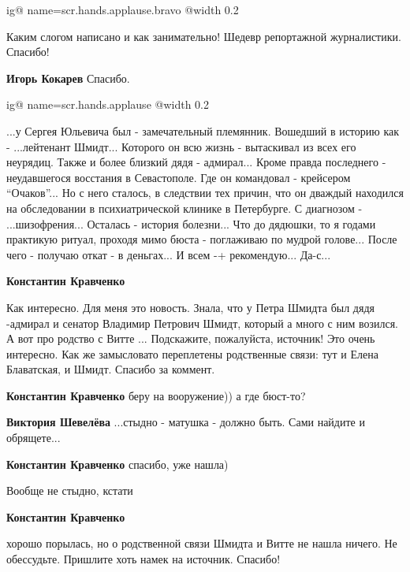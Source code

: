 \begin{itemize}

\ifcmt
  ig@ name=scr.hands.applause.bravo
  @width 0.2
\fi

Каким слогом написано и как занимательно! Шедевр репортажной журналистики. Спасибо!

\textbf{Игорь Кокарев} Спасибо.


\ifcmt
  ig@ name=scr.hands.applause
  @width 0.2
\fi


...у Сергея Юльевича был - замечательный племянник. Вошедший в историю как -
...лейтенант Шмидт... Которого он всю жизнь - вытаскивал из всех его неурядиц.
Также и более близкий дядя - адмирал... Кроме правда последнего - неудавшегося
восстания в Севастополе. Где он командовал - крейсером \enquote{Очаков}... Но с него
сталось, в следствии тех причин, что он дваждый находился на обследовании в
психиатрической клинике в Петербурге. С диагнозом - ...шизофрения... Осталась -
история болезни... Что до дядюшки, то я годами практикую ритуал, проходя мимо
бюста - поглаживаю по мудрой голове... После чего - получаю откат - в
деньгах... И всем -+ рекомендую... Да-с...

\begin{itemize} %
\textbf{Константин Кравченко} 

Как интересно. Для меня это новость. Знала, что у Петра Шмидта был дядя
-адмирал и сенатор Владимир Петрович Шмидт, который а много с ним возился. А
вот про родство с Витте ... Подскажите, пожалуйста, источник! Это очень
интересно. Как же замысловато переплетены родственные связи: тут и Елена
Блаватская, и Шмидт. Спасибо за коммент.

\textbf{Константин Кравченко} беру на вооружение)) а где бюст-то?

\begin{itemize} %
\textbf{Виктория Шевелёва} ...стыдно - матушка - должно быть. Сами найдите и обрящете...

\textbf{Константин Кравченко} спасибо, уже нашла)

Вообще не стыдно, кстати
\end{itemize} %

\textbf{Константин Кравченко} 

хорошо порылась, но о родственной связи Шмидта и Витте не нашла ничего. Не
обессудьте. Пришлите хоть намек на источник. Спасибо!


\end{itemize}
\end{itemize}
